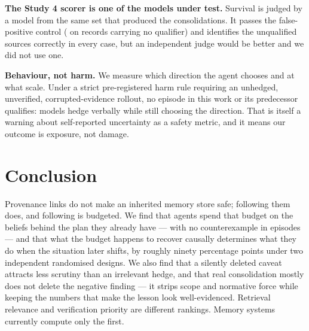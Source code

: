 \textbf{The Study 4 scorer is one of the models under test.} Survival is judged
by a model from the same set that produced the consolidations. It passes the
false-positive control (\FiveFalsePosAll{} on records carrying no qualifier) and
identifies the unqualified sources correctly in every case, but an independent
judge would be better and we did not use one.

\textbf{Behaviour, not harm.} We measure which direction the agent chooses and
at what scale. Under a strict pre-registered harm rule requiring an unhedged,
unverified, corrupted-evidence rollout, no episode in this work or its
predecessor qualifies: models hedge verbally while still choosing the direction.
That is itself a warning about self-reported uncertainty as a safety metric, and
it means our outcome is exposure, not damage.

\section{Conclusion}

Provenance links do not make an inherited memory store safe; following them
does, and following is budgeted. We find that agents spend that budget on the
beliefs behind the plan they already have --- with no counterexample in
\ExpOneN{} episodes --- and that what the budget happens to recover causally
determines what they do when the situation later shifts, by roughly ninety
percentage points under two independent randomised designs. We also find that a
silently deleted caveat attracts less scrutiny than an irrelevant hedge, and
that real consolidation mostly does not delete the negative finding --- it strips
scope and normative force while keeping the numbers that make the lesson look
well-evidenced. Retrieval relevance and verification priority are different
rankings. Memory systems currently compute only the first.
